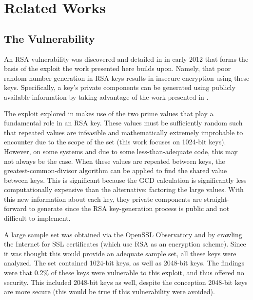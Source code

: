 \documentclass[12pt]{ucthesis}
\begin{document}

\chapter{Related Works}
\label{related}

\section{The Vulnerability}
An RSA vulnerability was discovered and detailed in \cite{lenstra2012ron} in
early 2012 that forms the basis of the exploit the work presented here builds
upon. Namely, that poor random number generation in RSA keys results in
insecure encryption using these keys. Specifically, a key's private components
can be generated using publicly available information by taking advantage of
the work presented in \cite{scharfglass2012breaking}.

The exploit explored in \cite{lenstra2012ron} makes use of the two prime
values that play a fundamental role in an RSA key. These values must be
sufficiently random such that repeated values are infeasible and mathematically
extremely improbable to encounter due to the scope of the set (this work
focuses on 1024-bit keys). However, on some systems and due to some
less-than-adequate code, this may not always be the case. When these values are
repeated between keys, the greatest-common-divisor algorithm can be applied to
find the shared value between keys. This is significant because the GCD
calculation is significantly less computationally expensive than the
alternative: factoring the large values. With this new information about each key,
they private components are straight-forward to generate since the RSA
key-generation process is public and not difficult to implement.

A large sample set was obtained via the OpenSSL Observatory and by crawling the
Internet for SSL certificates (which use RSA as an encryption scheme). Since it
was thought this would provide an adequate sample set, all these keys were
analyzed. The set contained 1024-bit keys, as well as 2048-bit keys. The
findings were that 0.2\% of these keys were vulnerable to this exploit, and
thus offered no security. This included 2048-bit keys as well, despite the
conception 2048-bit keys are more secure (this would be true if this
vulnerability were avoided).
\end{document}
